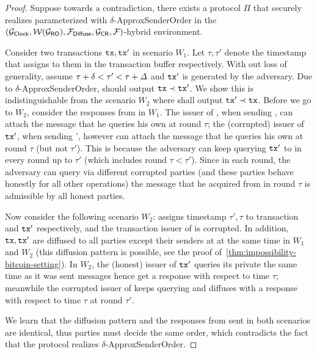 \begin{proof}
	Suppose towards a contradiction, there exists a protocol $\Pi$ that securely realizes \funcFairLedger parameterized with $\delta$-\textsf{ApproxSenderOrder} in the $(\mathcal{G}_{\mathsf{Clock}}, \mathcal{W}(\mathcal{G}_{\mathsf{RO}}),\allowbreak \mathcal{F}_{\mathsf{Diffuse}}, \mathcal{G}_{\mathsf{CR}}, \mathcal{F})$-hybrid environment.

	Consider two transactions $\mathtt{tx}, \mathtt{tx}'$ in scenario $W_1$.
	Let $\tau, \tau'$ denote the timestamp that \funcFairLedger assigns to them in the transaction buffer respectively.
	With out loss of generality, assume $\tau + \delta < \tau' < \tau + \varDelta$ and $\mathtt{tx}'$ is generated by the adversary.
	Due to $\delta$-\textsf{ApproxSenderOrder}, \funcFairLedger should output $\mathtt{tx} \prec \mathtt{tx}'$.
	We show this is indistinguishable from the scenario $W_2$ where \funcFairLedger shall output $\mathtt{tx}' \prec \mathtt{tx}$.
	Before we go to $W_2$, consider the responses from \F in $W_1$.
	The issuer of \tx, when sending \tx, can attach the message that he queries his own \F at round $\tau$; the (corrupted) issuer of $\mathtt{tx}'$, when sending \tx', however can attach the message that he queries his own \F at round $\tau$ (but not $\tau'$).
	This is because the adversary can keep querying $\mathtt{tx}'$ to \F in every round up to $\tau'$ (which includes round $\tau < \tau'$).
	Since in each round, the adversary can query \F via different corrupted parties (and these parties behave honestly for all other operations) the message that he acquired from \F in round $\tau $ is admissible by all honest parties.

	Now consider the following scenario $W_2$: \funcFairLedger assigns timestamp $\tau', \tau$ to transaction \tx and $\mathtt{tx}'$ respectively, and the transaction issuer of \tx is corrupted.
	In addition, $\mathtt{tx}, \mathtt{tx}'$ are diffused to all parties except their senders at at the same time in $W_1$ and $W_2$ (this diffusion pattern is possible, see the proof of~\cref{thm:impossibility-bitcoin-setting}).
	In $W_2$, the (honest) issuer of $\mathtt{tx}'$ queries its private \F the same time as it was sent messages hence get a response with respect to time $\tau$; meanwhile the corrupted issuer of \tx keeps querying \tx and diffuses \tx with a response with respect to time $\tau$ at round $\tau'$.

	We learn that the diffusion pattern and the responses from \F sent in both scenarios are identical, thus parties must decide the same order, which contradicts the fact that the protocol realizes $\delta$-\textsf{ApproxSenderOrder}.
\end{proof}